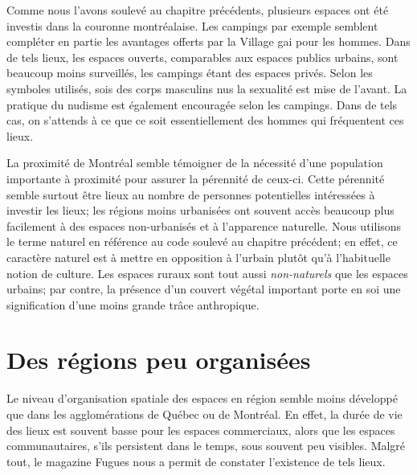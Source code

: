 Comme nous l'avons soulevé au chapitre précédents, plusieurs espaces ont été investis dans la couronne montréalaise.
Les campings par exemple semblent compléter en partie les avantages offerts par la Village gai pour les hommes.
Dans de tels lieux, les espaces ouverts, comparables aux espaces publics urbains, sont beaucoup moins surveillés, les campings étant  des espaces privés.
Selon les symboles utilisés, sois des corps masculins nus la sexualité est mise de l'avant.
La pratique du nudisme est également encouragée selon les campings.
Dans de tels cas, on s'attends à ce que ce soit essentiellement des hommes qui fréquentent ces lieux.

La proximité de Montréal semble témoigner de la nécessité d'une population importante à proximité pour assurer la pérennité de ceux-ci.
Cette pérennité semble surtout être lieux au nombre de personnes potentielles intéressées à investir les lieux; les régions moins urbanisées ont souvent accès beaucoup plus facilement à des espaces non-urbanisés et à l'apparence naturelle.
Nous utilisons le terme naturel en référence au code soulevé au chapitre précédent; en effet, ce caractère naturel est à mettre en opposition à l'urbain plutôt qu'à l'habituelle notion de culture.
Les espaces ruraux sont tout aussi \emph{non-naturels} que les espaces urbains; par contre, la présence d'un couvert végétal important porte en soi une signification d'une moins grande trâce anthropique.

\section{Des régions peu organisées}
\label{sec:des_regions_peu_organisees}
Le niveau d'organisation spatiale des espaces en région semble moins développé que dans les agglomérations de Québec ou de Montréal.
En effet, la durée de vie des lieux est souvent basse pour les espaces commerciaux, alors que les espaces communautaires, s'ils persistent dans le temps, sous souvent peu visibles.
Malgré tout, le magazine Fugues nous a permit de constater l'existence de tels lieux.


